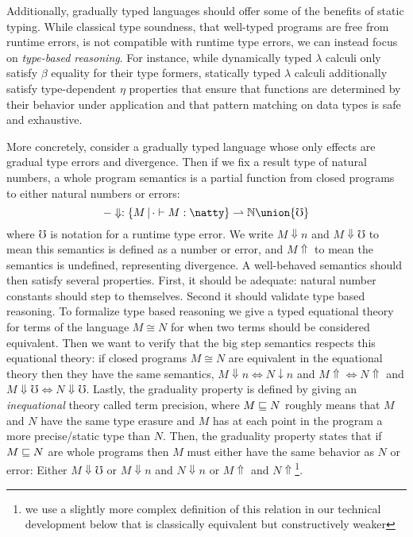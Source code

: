 Additionally, gradually typed languages should offer some of the
benefits of static typing. While classical type soundness, that
well-typed programs are free from runtime errors, is not compatible
with runtime type errors, we can instead focus on \emph{type-based
reasoning}. For instance, while dynamically typed $\lambda$ calculi
only satisfy $\beta$ equality for their type formers, statically typed
$\lambda$ calculi additionally satisfy type-dependent $\eta$
properties that ensure that functions are determined by their behavior
under application and that pattern matching on data types
is safe and exhaustive.

More concretely, consider a gradually typed language whose only
effects are gradual type errors and divergence. Then if we fix a
result type of natural numbers, a whole program semantics is a partial
function from closed programs to either natural numbers or errors:
\[ -\Downarrow : \{M \,|\, \cdot \vdash M : \natty \} \rightharpoonup \mathbb{N} \union {\mho} \]
where $\mho$ is notation for a runtime type error. We write $M
\Downarrow n$ and $M\Downarrow \mho$ to mean this semantics is defined
as a number or error, and $M\Uparrow$ to mean the semantics is
undefined, representing divergence.
%
A well-behaved semantics should then satisfy several properties. First, it
should be adequate: natural number constants should step to
themselves. Second it should validate type based reasoning. To
formalize type based reasoning we give a typed equational theory for
terms of the language $M \cong N$ for when two terms should be
considered equivalent. Then we want to verify that the big step
semantics respects this equational theory: if closed programs $M \cong
N$ are equivalent in the equational theory then they have the same
semantics, $M \Downarrow n \iff N \downarrow n$ and $M\Uparrow \iff N
\Uparrow$ and $M \Downarrow \mho \iff N \Downarrow \mho$.
%
Lastly, the graduality property is defined by giving an
\emph{inequational} theory called term precision, where $M \sqsubseteq N$
roughly means that $M$ and $N$ have the same type erasure and $M$ has
at each point in the program a more precise/static type than $N$.
%
Then, the graduality property states that if $M \sqsubseteq N$ are whole
programs then $M$ must either have the same behavior as $N$ or error:
Either $M\Downarrow \mho$ or $M \Downarrow n $ and $N \Downarrow n$ or
$M \Uparrow $ and $N \Uparrow$\footnote{we use a slightly more complex
definition of this relation in our technical development below that is
classically equivalent but constructively weaker}.

